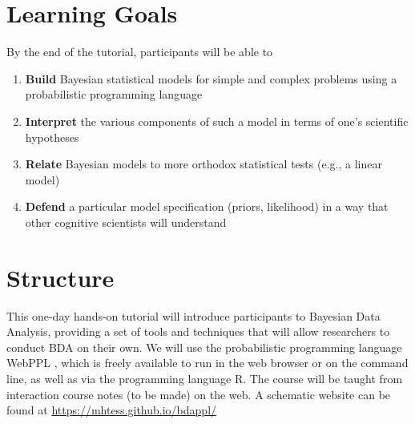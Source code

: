 \documentclass[10pt,letterpaper]{article}
\providecommand{\tightlist}{%
  \setlength{\itemsep}{0pt}\setlength{\parskip}{0pt}}
\begin{document}


\section{Learning Goals}

By the end of the tutorial, participants will be able to 

\begin{enumerate}
\tightlist
\item \textbf{Build} Bayesian statistical models for simple and complex problems using a probabilistic programming language 
\item \textbf{Interpret} the various components of such a model in terms of one's scientific hypotheses 
\item \textbf{Relate} Bayesian models to more orthodox statistical tests (e.g., a linear model) 
\item \textbf{Defend} a particular model specification (priors, likelihood) in a way that other cognitive scientists will understand
\end{enumerate}

\section{Structure}

This one-day hands-on tutorial will introduce participants to Bayesian Data Analysis, providing a set of tools and techniques that will allow researchers to conduct BDA on their own. 
We will use the probabilistic programming language WebPPL \cite{dippl}, which is freely available to run in the web browser or on the command line, as well as via the programming language R.  
The course will be taught from interaction course notes (to be made) on the web. 
A schematic website can be found at \url{https://mhtess.github.io/bdappl/}
\end{document}
